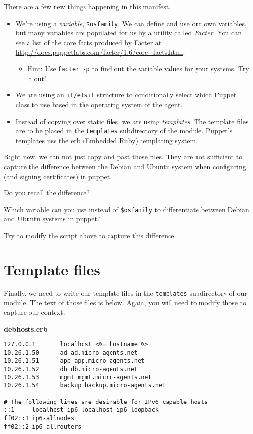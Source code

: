 \documentclass{article}   	%
\begin{document}

There are a few new things happening in this manifest.
\begin{itemize}
  \item We're using a \emph{variable}, \texttt{\$osfamily}.  We can define and use our own variables, but many variables are populated for us by a utility called \emph{Facter}.  You can see a list of the core facts produced by Facter at \\ 
  \url{http://docs.puppetlabs.com/facter/1.6/core_facts.html}.
  \begin{itemize}
  \item Hint: Use {\tt facter -p} to find out the variable values for your systems. Try it out!
  \end{itemize}
  \item We are using an \texttt{if/elsif} structure to conditionally select which Puppet class to use based in the operating system of the agent.
  \item Instead of copying over static files, we are using \emph{templates}.  The template files are to be placed in the \texttt{templates} subdirectory of the module.  Puppet's templates use the erb (Embedded Ruby) templating system.
\end{itemize}

Right now, we can not just copy and past those files. They are not sufficient to capture the difference between the Debian and Ubuntu system when configuring (and signing certificates) in puppet.

Do you recall the difference?

\vspace{0.5cm}

Which variable can you use instead of {\tt \$osfamily} to differentiate between Debian and Ubuntu systems in puppet?

Try to modify the script above to capture this difference.


\section{Template files}
Finally, we need to write our template files in the \texttt{templates} subdirectory of our module.  The text of those files is below. Again, you will need to modify those to capture our context.

\textbf{debhosts.erb}
\begin{verbatim}
127.0.0.1       localhost <%= hostname %>
10.26.1.50      ad ad.micro-agents.net
10.26.1.51      app app.micro-agents.net
10.26.1.52      db db.micro-agents.net
10.26.1.53      mgmt mgmt.micro-agents.net
10.26.1.54      backup backup.micro-agents.net

# The following lines are desirable for IPv6 capable hosts
::1     localhost ip6-localhost ip6-loopback
ff02::1 ip6-allnodes
ff02::2 ip6-allrouters
\end{verbatim}
\end{document}
